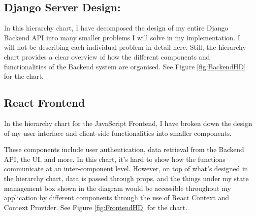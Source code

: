 \subsection{Django Server Design:}
In this hierarchy chart, I have decomposed the design of my entire Django Backend API into many smaller problems I will solve in my implementation. I will not be describing each individual problem in detail here. Still, the hierarchy chart provides a clear overview of how the different components and functionalities of the Backend system are organised. See Figure \ref{fig:BackendHD} for the chart.

\subsection{React Frontend}
In the hierarchy chart for the JavaScript Frontend, I have broken down the design of my user interface and client-side functionalities into smaller components.

These components include user authentication, data retrieval from the Backend API, the UI, and more. In this chart, it's hard to show how the functions communicate at an inter-component level. However, on top of what's designed in the hierarchy chart, data is passed through props, and the things under my state management box shown in the diagram would be accessible throughout my application by different components through the use of React Context and Context Provider. See Figure \ref{fig:FrontendHD} for the chart.




